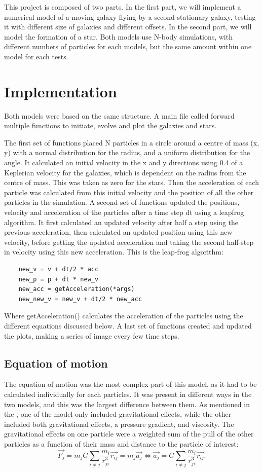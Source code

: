 \documentclass[a4paper,12pt]{article}
\begin{document}
This project is composed of two parts. In the first part, we will implement a numerical model of a moving galaxy flying by a second stationary galaxy, testing it with different size of galaxies and different offsets. In the second part, we will model the formation of a star. Both models use N-body simulations, with different numbers of particles for each models, but the same amount within one model for each tests. 

\section{Implementation}\label{sec:imp}

Both models were based on the same structure. A main file called forward multiple functions to initiate, evolve and plot the galaxies and stars.

The first set of functions placed N particles in a circle around a centre of mass (x, y) with a normal distribution for the radius, and a uniform distribution for the angle. It calculated an initial velocity in the x and y directions using 0.4 of a Keplerian velocity for the galaxies, which is dependent on the radius from the centre of mass. This was taken as zero for the stars. Then the acceleration of each particle was calculated from this initial velocity and the position of all the other particles in the simulation. A second set of functions updated the positions, velocity and acceleration of the particles after a time step dt using a leapfrog algorithm. It first calculated an updated velocity after half a step using the previous acceleration, then calculated an updated position using this new velocity, before getting the updated acceleration and taking the second half-step in velocity using this new acceleration. This is the leap-frog algorithm:
\begin{verbatim}
    new_v = v + dt/2 * acc
    new_p = p + dt * new_v
    new_acc = getAcceleration(*args)
    new_new_v = new_v + dt/2 * new_acc
\end{verbatim}
Where getAcceleration() calculates the acceleration of the particles using the different equations discussed below. A last set of functions created and updated the plots, making a series of image every few time steps.

\subsection{Equation of motion}
The equation of motion was the most complex part of this model, as it had to be calculated individually for each particles. It was present in different ways in the two models, and this was the largest difference between them. As mentioned in the , one of the model only included gravitational effects, while the other included both gravitational effects, a pressure gradient, and viscosity. The gravitational effects on one particle were a weighted sum of the pull of the other particles as a function of their mass and distance to the particle of interest:
$$\vec{F_j} = m_j G \sum_{i \neq j} \frac{m_i}{r^3_{ji}} \vec{r_{ij}} = m_j \vec{a_j} \Leftrightarrow \vec{a_j} = G \sum_{i \neq j} \frac{m_i}{r^3_{ji}}\vec{r_{ij}}.$$
\end{document}
